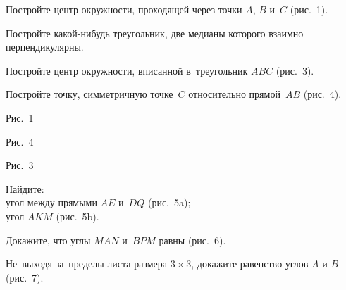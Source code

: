 



\begingroup
    \def\labelbox#1#2#3{\parbox[c]{#1}{\centering#3\par
    Рис.~#2\par\vspace{1ex}\null}}%

\begin{problems}

\item
Постройте центр окружности, проходящей через точки $A$, $B$ и~$C$ (рис.~1).

\item
Постройте какой-нибудь треугольник, две медианы которого взаимно
перпендикулярны.

\item
Постройте центр окружности, вписанной в~треугольник $ABC$ (рис.~3).

\item
Постройте точку, симметричную точке~$C$ относительно прямой~$AB$ (рис.~4).

\end{problems}

\vfill

\begin{center}

\labelbox{6.5cm} {1} {}
\labelbox{5.5cm} {4} {}
\labelbox{5.0cm} {3} {}

\end{center}

\vfill
\clearpage

\begin{problems}

\item
Найдите:
\\
\subproblem угол между прямыми $AE$ и~$DQ$ (рис.~5a);
\\
\subproblem угол $AKM$ (рис.~5b).

\item
Докажите, что углы $MAN$ и~$BPM$ равны (рис.~6).

\item
Не~выходя за~пределы листа размера $3 \times 3$, докажите равенство
углов $A$ и $B$ (рис.~7).

\end{problems}

